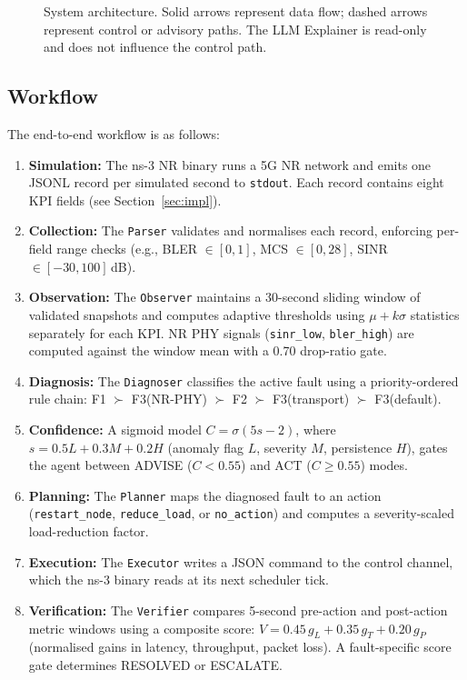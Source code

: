 \documentclass[12pt,a4paper]{article}
\begin{document}
\begin{figure}[H]
\caption{System architecture. Solid arrows represent data flow; dashed arrows
represent control or advisory paths. The LLM Explainer is read-only and does
not influence the control path.}
\label{fig:arch}
\end{figure}

\subsection{Workflow}

The end-to-end workflow is as follows:

\begin{enumerate}[noitemsep]
  \item \textbf{Simulation:} The ns-3 NR binary runs a 5G NR network and
    emits one JSONL record per simulated second to \texttt{stdout}. Each
    record contains eight KPI fields (see Section~\ref{sec:impl}).
  \item \textbf{Collection:} The \texttt{Parser} validates and normalises each
    record, enforcing per-field range checks (e.g., BLER $\in [0,1]$,
    MCS $\in [0,28]$, SINR $\in [-30, 100]$\,dB).
  \item \textbf{Observation:} The \texttt{Observer} maintains a 30-second
    sliding window of validated snapshots and computes adaptive thresholds
    using $\mu + k\sigma$ statistics separately for each KPI. NR PHY signals
    (\texttt{sinr\_low}, \texttt{bler\_high}) are computed against the window
    mean with a 0.70 drop-ratio gate.
  \item \textbf{Diagnosis:} The \texttt{Diagnoser} classifies the active
    fault using a priority-ordered rule chain: F1 $\succ$ F3(NR-PHY)
    $\succ$ F2 $\succ$ F3(transport) $\succ$ F3(default).
  \item \textbf{Confidence:} A sigmoid model
    $C = \sigma(5s - 2)$, where $s = 0.5L + 0.3M + 0.2H$ (anomaly flag $L$,
    severity $M$, persistence $H$), gates the agent between ADVISE
    ($C < 0.55$) and ACT ($C \geq 0.55$) modes.
  \item \textbf{Planning:} The \texttt{Planner} maps the diagnosed fault to an
    action (\texttt{restart\_node}, \texttt{reduce\_load}, or
    \texttt{no\_action}) and computes a severity-scaled load-reduction factor.
  \item \textbf{Execution:} The \texttt{Executor} writes a JSON command to the
    control channel, which the ns-3 binary reads at its next scheduler tick.
  \item \textbf{Verification:} The \texttt{Verifier} compares 5-second
    pre-action and post-action metric windows using a composite score:
    $V = 0.45\,g_L + 0.35\,g_T + 0.20\,g_P$ (normalised gains in latency,
    throughput, packet loss). A fault-specific score gate determines
    RESOLVED or ESCALATE.
\end{enumerate}
\end{document}
